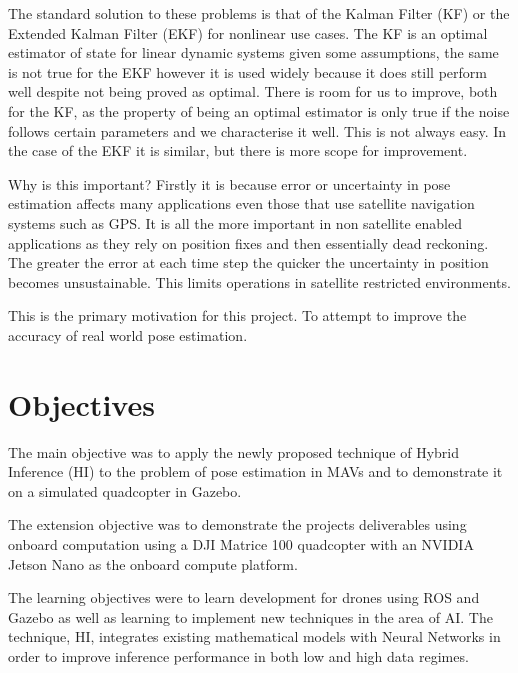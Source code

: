 \documentclass[]{../resources/final_report}
\begin{document}
The standard solution to these problems is that of the Kalman Filter (KF)
or the Extended Kalman Filter (EKF) for nonlinear use cases. The KF is an optimal estimator of state 
for linear dynamic systems given some assumptions, the same is not true for the EKF however it is used 
widely because it does still perform well despite not being proved as optimal. There is room for us to 
improve, both for the KF, as the property of being an optimal estimator is only true if the noise follows
certain parameters and we characterise it well. This is not always easy. In the case of the EKF it is 
similar, but there is more scope for improvement. 

Why is this important? Firstly it is because error or uncertainty in pose estimation affects many applications
even those that use satellite navigation systems such as GPS. It is all the more important in non satellite 
enabled applications as they rely on position fixes and then essentially dead reckoning. The greater the error
at each time step the quicker the uncertainty in position becomes unsustainable. This limits operations in satellite
restricted environments.

This is the primary motivation for this project. To attempt to improve the accuracy of real world pose 
estimation.


\section{Objectives}

The main objective was to apply the newly proposed technique of Hybrid Inference (HI)
\cite{Satorras2019CombiningGA} to the problem of pose estimation in MAVs and to demonstrate it on a simulated quadcopter in Gazebo. 

The extension objective was to demonstrate the projects deliverables using onboard computation using 
a DJI Matrice 100 quadcopter with an NVIDIA Jetson Nano as the onboard compute platform.

The learning objectives were to learn development for drones using ROS and Gazebo as well as 
learning to implement new techniques in the area of AI. The technique, HI, integrates existing 
mathematical models with Neural Networks in order to improve inference performance in both low 
and high data regimes.

\end{document}
